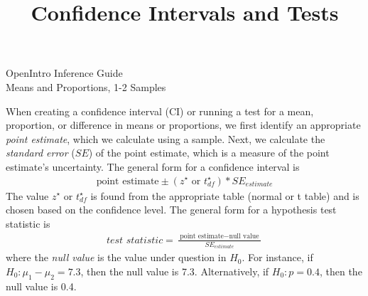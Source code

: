 \documentclass[11pt]{article}
\title{Confidence Intervals and Tests}
\date{}                                           %
\begin{document}

\begin{center}\color{oiB}
\Large OpenIntro Inference Guide \\[1mm]
Means and Proportions, 1-2 Samples   \normalsize
\end{center} 

\vspace{2mm}\noindent When creating a confidence interval (CI) or running a test for a mean, proportion, or difference in means or proportions, we first identify an appropriate \emph{point estimate}, which we calculate using a sample. Next, we calculate the \emph{standard error} ($SE$) of the point estimate, which is a measure of the point estimate's uncertainty. The general form for a confidence interval is 
\small
\begin{eqnarray*}
\text{point estimate} \pm (z^{\star}\text{ or }t_{df}^{\star})*SE_{estimate}
\end{eqnarray*}
\normalsize
The value $z^{\star}$ or $t_{df}^{\star}$ is found from the appropriate table (normal or t table) and is chosen based on the confidence level. The general form for a hypothesis test statistic is
\small
\begin{eqnarray*}
\textit{test statistic} = \frac{\ \text{point estimate} - \text{null value}\ }{SE_{estimate}}
\end{eqnarray*}
\normalsize
where the \emph{null value} is the value under question in $H_0$. For instance, if $H_0: \mu_1-\mu_2=7.3$,  then the null value is 7.3. Alternatively, if $H_0: p=0.4$, then the null value is 0.4. \\
\end{document}
